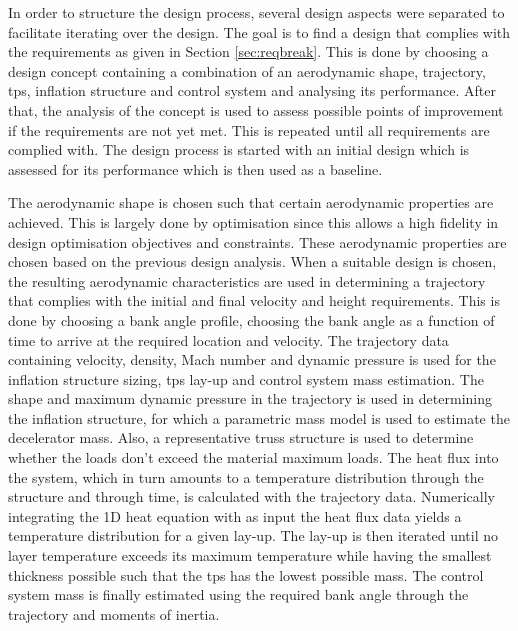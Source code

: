 In order to structure the design process, several design aspects were separated to facilitate  iterating over the design. The goal is to find a design that complies with the requirements as given in Section \ref{sec:reqbreak}. This is done by choosing a design concept containing a combination of an aerodynamic shape, trajectory, \gls{tps}, inflation structure and control system and analysing its performance. After that, the analysis of the concept is used to assess possible points of improvement if the requirements are not yet met. This is repeated until all requirements are complied with. The design process is started with an initial design which is assessed for its performance which is then used as a baseline.

The aerodynamic shape is chosen such that certain aerodynamic properties are achieved. This is largely done by optimisation since this allows a high fidelity in design optimisation objectives and constraints. These aerodynamic properties are chosen based on the previous design analysis. 
When a suitable design is chosen, the resulting aerodynamic characteristics are used in determining a trajectory that complies with the initial and final velocity and height requirements. This is done by choosing a bank angle profile, choosing the bank angle as a function of time to arrive at the required location and velocity. 
The trajectory data containing velocity, density, Mach number and dynamic pressure is used for the inflation structure sizing, \gls{tps} lay-up and control system mass estimation. The shape and maximum dynamic pressure in the trajectory is used in determining the inflation structure, for which a parametric mass model is used to estimate the decelerator mass. 
Also, a representative truss structure is used to determine whether the loads don't exceed the material maximum loads. The heat flux into the system, which in turn amounts to a temperature distribution through the structure and through time, is calculated with the trajectory data. Numerically integrating the 1D heat equation with as input the heat flux data yields a temperature distribution for a given lay-up. The lay-up is then iterated until no layer temperature exceeds its maximum temperature while having the smallest thickness possible such that the \gls{tps} has the lowest possible mass. 
The control system mass is finally estimated using the required bank angle through the trajectory and moments of inertia.

